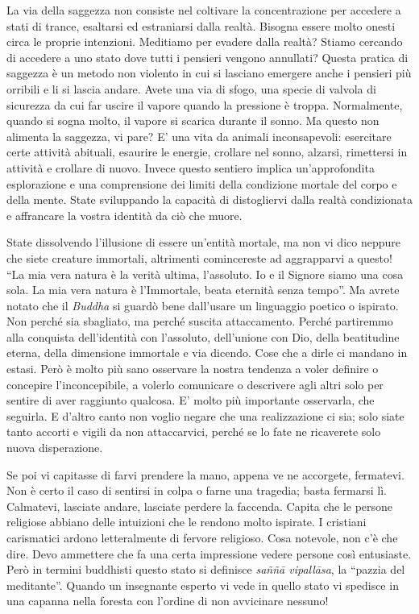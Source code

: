 La via della saggezza non consiste nel coltivare la concentrazione per
accedere a stati di trance, esaltarsi ed estraniarsi dalla realtà.
Bisogna essere molto onesti circa le proprie intenzioni. Meditiamo per
evadere dalla realtà? Stiamo cercando di accedere a uno stato dove tutti
i pensieri vengono annullati? Questa pratica di saggezza è un metodo non
violento in cui si lasciano emergere anche i pensieri più orribili e li
si lascia andare. Avete una via di sfogo, una specie di valvola di
sicurezza da cui far uscire il vapore quando la pressione è troppa.
Normalmente, quando si sogna molto, il vapore si scarica durante il
sonno. Ma questo non alimenta la saggezza, vi pare? E' una vita da
animali inconsapevoli: esercitare certe attività abituali, esaurire le
energie, crollare nel sonno, alzarsi, rimettersi in attività e crollare
di nuovo. Invece questo sentiero implica un'approfondita esplorazione e
una comprensione dei limiti della condizione mortale del corpo e della
mente. State sviluppando la capacità di distogliervi dalla realtà
condizionata e affrancare la vostra identità da ciò che muore.

State dissolvendo l'illusione di essere un'entità mortale, ma non vi
dico neppure che siete creature immortali, altrimenti comincereste ad
aggrapparvi a questo! ``La mia vera natura è la verità ultima,
l'assoluto. Io e il Signore siamo una cosa sola. La mia vera natura è
l'Immortale, beata eternità senza tempo''. Ma avrete notato che il \textit{Buddha}
si guardò bene dall'usare un linguaggio poetico o ispirato. Non perché
sia sbagliato, ma perché suscita attaccamento. Perché partiremmo alla
conquista dell'identità con l'assoluto, dell'unione con Dio, della
beatitudine eterna, della dimensione immortale e via dicendo. Cose che a
dirle ci mandano in estasi. Però è molto più sano osservare la nostra
tendenza a voler definire o concepire l'inconcepibile, a volerlo
comunicare o descrivere agli altri solo per sentire di aver raggiunto
qualcosa. E' molto più importante osservarla, che seguirla. E d'altro
canto non voglio negare che una realizzazione ci sia; solo siate tanto
accorti e vigili da non attaccarvici, perché se lo fate ne ricaverete
solo nuova disperazione.

Se poi vi capitasse di farvi prendere la mano, appena ve ne accorgete,
fermatevi. Non è certo il caso di sentirsi in colpa o farne una
tragedia; basta fermarsi lì. Calmatevi, lasciate andare, lasciate
perdere la faccenda. Capita che le persone religiose abbiano delle
intuizioni che le rendono molto ispirate. I cristiani carismatici ardono
letteralmente di fervore religioso. Cosa notevole, non c'è che dire.
Devo ammettere che fa una certa impressione vedere persone così
entusiaste. Però in termini buddhisti questo stato si definisce \textit{saññā vipallāsa},
la ``pazzia del meditante''. Quando un insegnante esperto vi
vede in quello stato vi spedisce in una capanna nella foresta con
l'ordine di non avvicinare nessuno!


